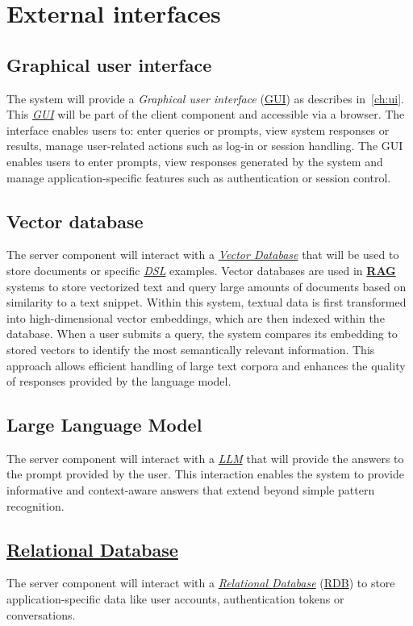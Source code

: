 \section{External interfaces}

\subsection{Graphical user interface}
The system will provide a \textit{Graphical user interface} (\hyperref[abr:GUI]{GUI}) as describes in~\ref{ch:ui}.
This \textit{\hyperref[abr:GUI]{GUI}} will be part of the client component and accessible via a browser. The interface enables users to: enter queries or prompts, view system responses or results, manage user-related actions such as log-in or session handling. The GUI enables users to enter prompts, view responses generated by the system and manage application-specific features such as authentication or session control.

\subsection{Vector database}
The server component will interact with a \textit{\hyperref[def:vector-database]{Vector Database}} that will be used to store documents or specific \textit{\hyperref[abr:DSL]{DSL}} examples. Vector databases are used in \textbf{\hyperref[abr:RAG]{RAG}} systems to store vectorized text and query large amounts of documents based on similarity to a text snippet. Within this system, textual data is first transformed into high-dimensional vector embeddings, which are then indexed within the database. When a user submits a query, the system compares its embedding to stored vectors to identify the most semantically relevant information. This approach allows efficient handling of large text corpora and enhances the quality of responses provided by the language model.

\subsection{Large Language Model}
The server component will interact with a \textit{\hyperref[abr:LLM]{LLM}} that will provide the answers to the prompt provided by the user. This interaction enables the system to provide informative and context-aware answers that extend beyond simple pattern recognition.

\subsection{\hyperref[def:relational-database]{Relational Database}}
The server component will interact with a \textit{\hyperref[def:relational-database]{Relational Database}} (\hyperref[abr:RDB]{RDB}) to store application-specific data like user accounts, authentication tokens or conversations. 